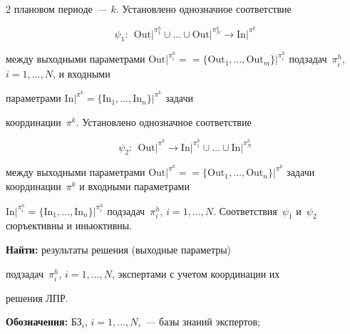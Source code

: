 \begin{multicols}{2}
плановом периоде~--- $k$. Установлено однозначное соответствие 


$$\psi_1:\ \ 


\mathrm{Out}\vert^{\pi_1^h}\cup\ldots \cup \mathrm{Out}\vert^{\pi_N^h}\rightarrow \mathrm{In}\vert^{\pi^k}


$$ 


между выходными параметрами $\mathrm{Out}\vert^{\pi_i^h}=$\linebreak $=\{\mathrm{Out}_1, \ldots , 


\mathrm{Out}_m\}\vert^{\pi_i^h}$ подзадач~$\pi_i^h$, $i=1, \ldots , N$, и входными 


параметрами $\mathrm{In}\vert^{\pi^k}=\{\mathrm{In}_1, \ldots , \mathrm{In}_n\}\vert^{\pi^k}$ задачи 


координации~$\pi^k$. Установлено однозначное соответствие


$$


\psi_2:\ \ 


\mathrm{Out}\vert^{\pi^k}\rightarrow \mathrm{In}\vert^{\pi_1^h}\cup\ldots\cup \mathrm{In}\vert^{\pi_N^h}


$$ 


между выходными параметрами $\mathrm{Out}\vert^{\pi^k}=$\linebreak $=\{\mathrm{Out}_1, \ldots 


,\mathrm{Out}_n\}\vert^{\pi^k}$ задачи координации~$\pi^k$ и входными параметрами 


$\mathrm{In}\vert^{\pi_i^h} =\{\mathrm{In}_1, \ldots ,\mathrm{In}_n\}\vert^{\pi_i^h}$ подзадач~$\pi_i^h$, $i=1, 


\ldots , N$. Соответствия~$\psi_1$ и~$\psi_2$ сюръективны и иньюктивны.





\smallskip


  


\noindent


  \textbf{Найти:} результаты решения (выходные пара\-мет\-ры) 


подзадач~$\pi_i^h$, $i=1, \ldots ,N$, экспертами с учетом координации их 


решения ЛПР.





\smallskip


  


\noindent  


\textbf{Обозначения:} БЗ$_i$, $i = 1, \ldots , N$,~--- базы знаний экспертов; 



\end{multicols}
